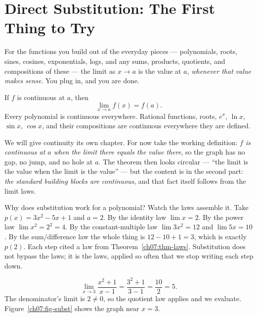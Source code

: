 \section{Direct Substitution: The First Thing to Try}
\label{ch07:substitution}

For the functions you build
out of the everyday pieces --- polynomials, roots, sines, cosines,
exponentials, logs, and any sums, products, quotients, and compositions of
these --- the limit as $x\to a$ is the value at $a$, \emph{whenever that
value makes sense}. You plug in, and you are done.

\begin{theorem}
\label{ch07:thm-subst}
If $f$ is continuous at $a$, then
\[
  \lim_{x\to a} f(x) = f(a).
\]
Every polynomial is continuous everywhere. Rational functions, roots,
$e^{x}$, $\ln x$, $\sin x$, $\cos x$, and their compositions are continuous
everywhere they are defined.
\end{theorem}

We will give continuity its own chapter. For now take the working
definition: \emph{$f$ is continuous at $a$ when the limit there equals the
value there}, so the graph has no gap, no jump, and no hole at $a$. The theorem then looks
circular --- ``the limit is the value when the limit is the value'' --- but
the content is in the second part: \emph{the standard building blocks
are continuous}, and that fact itself follows from the limit
laws.

\begin{whybox}
Why does substitution work for a polynomial? Watch the laws assemble it. Take
$p(x) = 3x^{2} - 5x + 1$ and $a = 2$. By the identity law $\lim x = 2$. By the
power law $\lim x^{2} = 2^{2} = 4$. By the constant-multiple law
$\lim 3x^{2} = 12$ and $\lim 5x = 10$. By the sum/difference law the whole
thing is $12 - 10 + 1 = 3$, which is exactly $p(2)$. Each step cited a law from
Theorem~\ref{ch07:thm-laws}. Substitution does not bypass the
laws; it is the laws, applied so often that we stop writing each step down.
\end{whybox}

\begin{example}
\label{ch07:ex-subst1}
\[
  \lim_{x\to 3} \frac{x^{2}+1}{x-1}
  = \frac{3^{2}+1}{3-1}
  = \frac{10}{2}
  = 5.
\]
The denominator's limit is $2\neq 0$, so the quotient law applies and we
evaluate. Figure~\ref{ch07:fig-subst} shows the graph near $x=3$.
\end{example}


